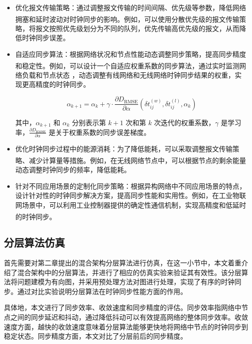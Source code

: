 \documentclass[UTF8,a4paper,12pt]{ctexart}
\numberwithin{equation}{section}
\begin{document}
	\begin{itemize}
		\item 优化报文传输策略：通过调整报文传输的时间间隔、优先级等参数，降低网络拥塞和延时波动对时钟同步的影响\textsuperscript{\cite{mizrahi2012slave}}。例如，可以使用分散优先级的报文传输策略，将报文按照优先级划分为不同的队列，优先传输高优先级的报文，从而降低时钟同步误差。
		\item 自适应同步算法：根据网络状况和节点性能动态调整同步策略，提高同步精度和稳定性\textsuperscript{\cite{fradkov1997adaptive}}。例如，可以设计一个自适应权重系数的同步算法，通过实时监测网络负载和节点状态
		，动态调整有线网络和无线网络时钟同步结果的权重，实现更高精度的时钟同步。
		
		\begin{equation}
			\alpha_{k+1} = \alpha_k + \gamma \cdot \frac{\partial D_\text{RMSE}}{\partial \alpha} (\delta t_{ij}^{(w)}, \delta t_{ij}^{(l)}, \alpha_k)
		\end{equation}
		
		其中，$\alpha_{k+1}$ 和 $\alpha_k$ 分别表示第 $k+1$ 次和第 $k$ 次迭代的权重系数，$\gamma$ 是学习率，$\frac{\partial D_\text{RMSE}}{\partial \alpha}$ 是关于权重系数的同步误差梯度。
		
		\item 优化时钟同步过程中的能源消耗：为了降低能耗，可以采取调整报文传输策略、减少计算量等措施\textsuperscript{\cite{xue2021wicsync}}。例如，在无线网络节点中，可以根据节点的剩余能量动态调整时钟同步的频率，降低能耗。
		
		\item 针对不同应用场景的定制化同步策略：根据异构网络中不同应用场景的特点，设计针对性的时钟同步解决方案，提高同步性能和实用性。例如，在工业物联网场景中，可以利用工业控制器提供的确定性通信机制，实现高精度和低延时的时钟同步\textsuperscript{\cite{gangakhedkar2018use}}。
		
	\end{itemize}
	
	\subsection{分层算法仿真}
	
	首先需要对第二章提出的混合架构分层算法进行仿真，在这一小节中，本文着重介绍了混合架构中的分层算法，并进行了相应的仿真实验来验证其有效性。该分层算法将问题建模为有向图，并采用预处理方法对图进行处理，实现了有序的时钟同步。通过对比实验说明分层算法在时钟同步性能方面的作用。
	
	具体地，本文进行了同步效率、收敛速度和同步精度的评估。同步效率指网络中节点之间的同步延迟和抖动，通过降低抖动可以有效提高网络的整体同步效率。收敛速度方面，越快的收敛速度意味着分层算法能够更快地将网络中节点的时钟同步到稳定状态。同步精度方面，本文对比了分层前后的同步精度。
	
\end{document}
